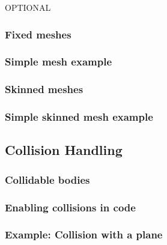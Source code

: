 OPTIONAL 

\subsubsection{Fixed meshes}

\subsubsection{Simple mesh example}


\subsubsection{Skinned meshes}

\subsubsection{Simple skinned mesh example}


\subsection{Collision Handling}

\subsubsection{Collidable bodies}

\subsubsection{Enabling collisions in code}

\subsubsection{Example: Collision with a plane}


